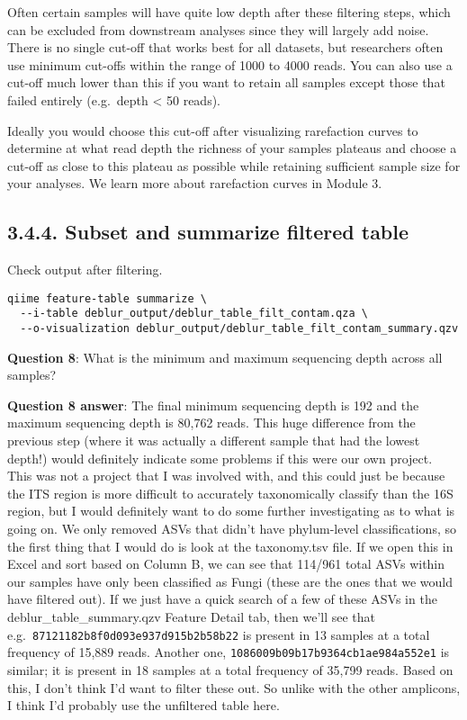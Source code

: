 \documentclass[
]{book}
\begin{document}
Often certain samples will have quite low depth after these filtering steps, which can be excluded from downstream analyses since they will largely add noise. There is no single cut-off that works best for all datasets, but researchers often use minimum cut-offs within the range of 1000 to 4000 reads. You can also use a cut-off much lower than this if you want to retain all samples except those that failed entirely (e.g.~depth \textless{} 50 reads).

Ideally you would choose this cut-off after visualizing rarefaction curves to determine at what read depth the richness of your samples plateaus and choose a cut-off as close to this plateau as possible while retaining sufficient sample size for your analyses. We learn more about rarefaction curves in Module 3.

\subsection{3.4.4. Subset and summarize filtered table}\label{subset-and-summarize-filtered-table-2}

Check output after filtering.

\begin{verbatim}
qiime feature-table summarize \
  --i-table deblur_output/deblur_table_filt_contam.qza \
  --o-visualization deblur_output/deblur_table_filt_contam_summary.qzv
\end{verbatim}

\textbf{Question 8}: What is the minimum and maximum sequencing depth across all samples?

\textbf{Question 8 answer}: The final minimum sequencing depth is 192 and the maximum sequencing depth is 80,762 reads. This huge difference from the previous step (where it was actually a different sample that had the lowest depth!) would definitely indicate some problems if this were our own project. This was not a project that I was involved with, and this could just be because the ITS region is more difficult to accurately taxonomically classify than the 16S region, but I would definitely want to do some further investigating as to what is going on. We only removed ASVs that didn't have phylum-level classifications, so the first thing that I would do is look at the taxonomy.tsv file. If we open this in Excel and sort based on Column B, we can see that 114/961 total ASVs within our samples have only been classified as Fungi (these are the ones that we would have filtered out). If we just have a quick search of a few of these ASVs in the deblur\_table\_summary.qzv Feature Detail tab, then we'll see that e.g.~\texttt{87121182b8f0d093e937d915b2b58b22} is present in 13 samples at a total frequency of 15,889 reads. Another one, \texttt{1086009b09b17b9364cb1ae984a552e1} is similar; it is present in 18 samples at a total frequency of 35,799 reads. Based on this, I don't think I'd want to filter these out. So unlike with the other amplicons, I think I'd probably use the unfiltered table here.
\end{document}
